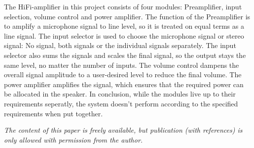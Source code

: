 \begin{multicols}{2}
{\begin{minipage}{2.8in}
The HiFi-amplifier in this project consists of four modules: Preamplifier, input selection, volume control and power amplifier. The function of the Preamplifier is to amplify a microphone signal to line level, so it is treated on equal terms as a line signal. 
The input selector is used to choose the microphone signal or stereo signal: No signal, both signals or the individual signals separately. The input selector also sums the signals and scales the final signal, so the output stays the same level, no matter the number of inputs.
The volume control dampens the overall signal amplitude to a user-desired level to reduce the final volume.
The power amplifier amplifies the signal, which ensures that the required power can be allocated in the speaker.
In conclusion, while the modules live up to their requirements seperatly, the system doesn't perform according to the specified requirements when put together. 
\end{minipage}}
\newline
\end{multicols}
\textit{\scriptsize{The content of this paper is freely available, but publication (with references) is only allowed with permission from the author.}}